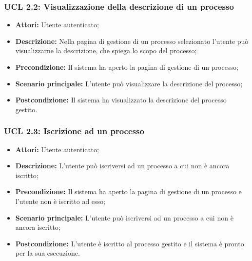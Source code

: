 \subsubsection{UCL 2.2: Visualizzazione della descrizione di un processo}
\begin{itemize}
\item \textbf{Attori:} Utente autenticato;
\item \textbf{Descrizione:} Nella pagina di gestione di un processo selezionato l'utente può visualizzarne la descrizione, che spiega lo scopo del processo;
\item \textbf{Precondizione:} Il sistema ha aperto la pagina di gestione di un processo;\\
\item \textbf{Scenario principale:} L'utente può visualizzare la descrizione del processo;
\item \textbf{Postcondizione:} Il sistema ha visualizzato la descrizione del processo gestito.
\end{itemize}

\hypertarget{L2.3}{}
\subsubsection{UCL 2.3: Iscrizione ad un processo}
\begin{itemize}
\item \textbf{Attori:} Utente autenticato;
\item \textbf{Descrizione:} L'utente può iscriversi ad un processo a cui non è ancora iscritto;
\item \textbf{Precondizione:} Il sistema ha aperto la pagina di gestione di un processo e l'utente non è iscritto ad esso;
\item \textbf{Scenario principale:} L'utente può iscriversi ad un processo a cui non è ancora iscritto;
\item \textbf{Postcondizione:} L'utente è iscritto al processo gestito e il sistema è pronto per la sua esecuzione.
\end{itemize}

